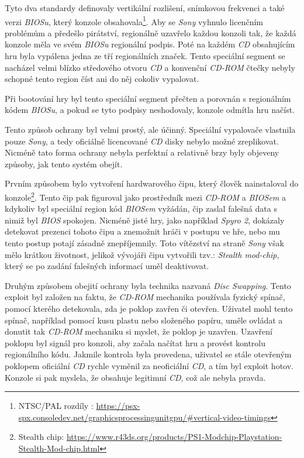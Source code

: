 Tyto dva standardy definovaly vertikální rozlišení, 
snímkovou frekvenci a také verzi \textit{BIOSu}, který konzole obsahovala\footnote{NTSC/PAL rozdíly \cite{PSXSpec}: \url{https://psx-spx.consoledev.net/graphicsprocessingunitgpu/\#vertical-video-timings}}. 
Aby se \textit{Sony} vyhnulo licenčním problémům a předešlo pirátství, regionálně uzavřelo každou konzoli tak, že každá konzole měla ve svém \textit{BIOSu} regionální podpis. 
Poté na každém \textit{CD} obsahujícím hru byla vypálena jedna ze tří regionálních značek. 
Tento speciální segment se nacházel velmi blízko středového otvoru \textit{CD} a 
konvenční \textit{CD-ROM} čtečky nebyly schopné tento region číst ani do něj cokoliv vypalovat.

Při bootování hry byl tento speciální segment přečten a porovnán s regionálním kódem \textit{BIOSu}, 
a pokud se tyto podpisy neshodovaly, konzole odmítla hru načíst.

Tento způsob ochrany byl velmi prostý, ale účinný. Speciální vypalovače vlastnila pouze \textit{Sony}, 
a tedy oficiálně licencované \textit{CD} disky nebylo možné zreplikovat. 
Nicméně tato forma ochrany nebyla perfektní a relativně brzy byly objeveny způsoby, jak tento systém obejít.

Prvním způsobem bylo vytvoření hardwarového čipu, který člověk nainstaloval do konzole\footnote{Stealth chip: \url{https://www.r43ds.org/products/PS1-Modchip-Playstation-Stealth-Mod-chip.html}}. 
Tento čip pak figuroval jako prostředník mezi \textit{CD-ROM} a \textit{BIOSem}
a kdykoliv byl speciální region kód \textit{BIOSem} vyžádán, čip zaslal falešná data s nimiž byl \textit{BIOS} spokojen.
Nicméně jisté hry, jako například \textit{Spyro 2}, dokázaly detekovat prezenci tohoto čipu a znemožnit hráči v postupu ve hře,
nebo mu tento postup potají zásadně znepříjemnily. Toto vítězství na straně \textit{Sony} však mělo krátkou životnost, jelikož
vývojáři čipu vytvořili tzv.: \textit{Stealth mod-chip}, který se po zaslání falešných informací uměl deaktivovat.

Druhým způsobem obejití ochrany byla technika nazvaná \textit{Disc Swapping}.
Tento exploit byl založen na faktu, že \textit{CD-ROM} mechanika používala fyzický spínač, 
pomocí kterého detekovala, zda je poklop zavřen či otevřen. 
Uživatel mohl tento spínač, například pomocí kusu plastu nebo složeného papíru, uměle ovládat a donutit tak \textit{CD-ROM} mechaniku si myslet, že poklop je uzavřen. 
Uzavření poklopu byl signál pro konzoli, aby začala načítat hru a provést kontrolu regionálního kódu. 
Jakmile kontrola byla provedena, uživatel se stále otevřeným poklopem oficiální \textit{CD} rychle vyměnil za neoficiální \textit{CD}, 
a tím byl exploit hotov. Konzole si pak myslela, že obsahuje legitimní \textit{CD}, což ale nebyla pravda.

